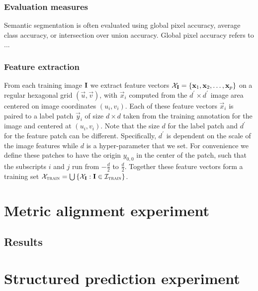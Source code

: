 \subsubsection{Evaluation measures}

Semantic segmentation is often evaluated using global pixel accuracy, average class accuracy, or intersection over union accuracy. Global pixel accuracy refers to ...


\subsubsection{Feature extraction}

From each training image $\mathbf{I}$ we extract feature vectors $\mathcal{X}_{\mathbf{I}} = \left\{ \mathbf{x}_1, \mathbf{x}_2, \ldots, \mathbf{x}_p \right\}$ on a regular hexagonal grid $(\vec{u}, \vec{v})$, with $\vec{x}_i$ computed from the $d^\prime \times d^\prime$ image area centered on image coordinates $(u_i, v_i)$. Each of these feature vectors $\vec{x}_i$ is paired to a label patch $\vec{y}_i$ of size $d \times d$ taken from the training annotation for the image and centered at $(u_i, v_i)$. Note that the size $d$ for the label patch and $d^\prime$ for the feature patch can be different. Specifically, $d^\prime$ is dependent on the scale of the image features while $d$ is a hyper-parameter that we set. For convenience we define these patches to have the origin $y_{0,0}$ in the center of the patch, such that the subscripts $i$ and $j$ run from $-\tfrac{d}{2}$ to $\tfrac{d}{2}$. Together these feature vectors form a training set $\mathcal{X}_\textsc{train} = \bigcup\left\{\mathcal{X}_{\mathbf{I}}: \mathbf{I} \in \mathcal{I}_\textsc{train} \right\}$.




\section{Metric alignment experiment}



\subsection{Results}



\section{Structured prediction experiment}



